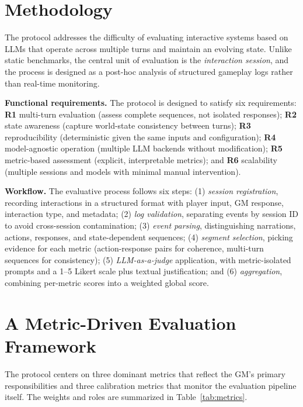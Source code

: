 \documentclass[12pt]{article}
\begin{document}
\section{Methodology}
\label{sec:method}

The protocol addresses the difficulty of evaluating interactive systems based on LLMs that operate across multiple turns and maintain an evolving state. Unlike static benchmarks, the central unit of evaluation is the \textit{interaction session}, and the process is designed as a post-hoc analysis of structured gameplay logs rather than real-time monitoring.

\textbf{Functional requirements.} The protocol is designed to satisfy six requirements: \textbf{R1} multi-turn evaluation (assess complete sequences, not isolated responses); \textbf{R2} state awareness (capture world-state consistency between turns); \textbf{R3} reproducibility (deterministic given the same inputs and configuration); \textbf{R4} model-agnostic operation (multiple LLM backends without modification); \textbf{R5} metric-based assessment (explicit, interpretable metrics); and \textbf{R6} scalability (multiple sessions and models with minimal manual intervention).

\textbf{Workflow.} The evaluative process follows six steps: (1) \textit{session registration}, recording interactions in a structured format with player input, GM response, interaction type, and metadata; (2) \textit{log validation}, separating events by session ID to avoid cross-session contamination; (3) \textit{event parsing}, distinguishing narrations, actions, responses, and state-dependent sequences; (4) \textit{segment selection}, picking evidence for each metric (action-response pairs for coherence, multi-turn sequences for consistency); (5) \textit{LLM-as-a-judge} application, with metric-isolated prompts and a 1--5 Likert scale plus textual justification; and (6) \textit{aggregation}, combining per-metric scores into a weighted global score.

\section{A Metric-Driven Evaluation Framework}
\label{sec:proposal}

The protocol centers on three dominant metrics that reflect the GM's primary responsibilities and three calibration metrics that monitor the evaluation pipeline itself. The weights and roles are summarized in Table~\ref{tab:metrics}.
\end{document}
